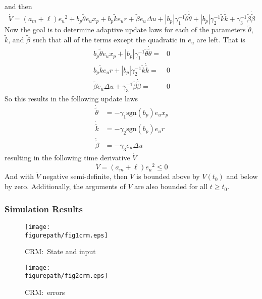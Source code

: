and then
\begin{equation*}
  \dot{V}=(a_{m}+\ell)e_{u}{}^{2}+b_{p}\tilde{\theta}e_{u}x_{p}+b_{p}\tilde{k}e_{u}r+\tilde{\beta}e_{u}\Delta u+
  |b_{p}|\gamma_{1}^{-1}\tilde{\theta}\dot{\tilde{\theta}}+
  |b_{p}|\gamma_{2}^{-1}\tilde{k}\dot{\tilde{k}}+
  \gamma_{3}^{-1}\tilde{\beta}\dot{\tilde{\beta}}
\end{equation*}
Now the goal is to determine adaptive update laws for each of the parameters $\tilde{\theta}$, $\tilde{k}$, and $\tilde{\beta}$ such that all of the terms except the quadratic in $e_{u}$ are left.
That is
\begin{align*}
  b_{p}\tilde{\theta}e_{u}x_{p}+|b_{p}|\gamma_{1}^{-1}\tilde{\theta}\dot{\tilde{\theta}}=&0 \\
  b_{p}\tilde{k}e_{u}r+|b_{p}|\gamma_{2}^{-1}\tilde{k}\dot{\tilde{k}}=&0 \\
  \tilde{\beta}e_{u}\Delta u+\gamma_{3}^{-1}\tilde{\beta}\dot{\tilde{\beta}}=&0
\end{align*}
So this results in the following update laws
\begin{align*}
  \dot{\tilde{\theta}}&=-\gamma_{1}\text{sgn}(b_{p})e_{u}x_{p} \\
  \dot{\tilde{k}}&=-\gamma_{2}\text{sgn}(b_{p})e_{u}r \\
  \dot{\tilde{\beta}}&=-\gamma_{3}e_{u}\Delta u
\end{align*}
resulting in the following time derivative $\dot{V}$
\begin{equation*}
  \dot{V}=(a_{m}+\ell)e_{u}{}^{2}\leq0
\end{equation*}
And with $\dot{V}$ negative semi-definite, then $V$ is bounded above by $V(t_{0})$ and below by zero.
Additionally, the arguments of $V$ are also bounded for all $t\geq t_{0}$.

\subsubsection{Simulation Results}

\begin{figure}[H]
  \begin{center}
    \texttt{[image: \\figurepath/fig1crm.eps]}
    \caption{CRM:\ State and input}
  \end{center}
\end{figure}

\begin{figure}[H]
  \begin{center}
    \texttt{[image: \\figurepath/fig2crm.eps]}
    \caption{CRM:\ errors}
  \end{center}
\end{figure}

